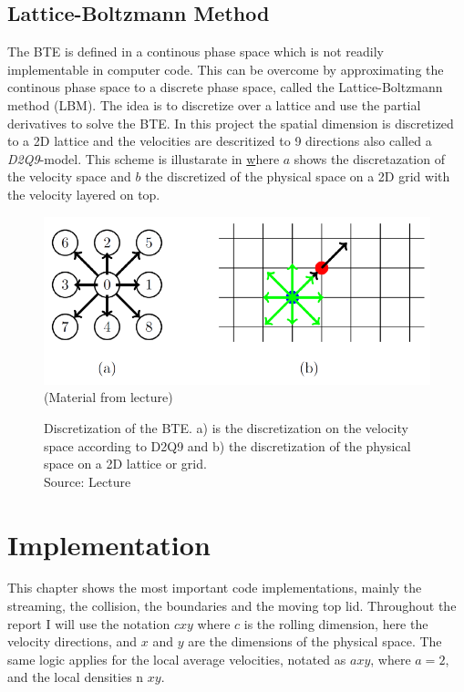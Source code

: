 \documentclass[a4paper,11pt, oneside]{book}
\begin{document}
\clearpage
\section{Lattice-Boltzmann Method} \label{sec:lbm}
The BTE is defined in a continous phase space which is not readily implementable in computer code.
This can be overcome by approximating the continous phase space to a discrete phase space, called the Lattice-Boltzmann method (LBM).
The idea is to discretize over a lattice and use the partial derivatives to solve the BTE.
In this project the spatial dimension is discretized to a 2D lattice and the velocities are descritized to 9 directions also called a \textit{D2Q9}-model.
This scheme is illustarate in \href{fig:d2q9-scheme} where $a$ shows the discretazation of the velocity space and $b$ the discretized of the physical space on a 2D grid with the velocity layered on top.
\begin{figure}[h]
  \centering
  \includegraphics[width=0.8\columnwidth]{d2q9_scheme.png}\\
  \small{(Material from lecture)}
  \caption[Discretization of the BTE]{Discretization of the BTE. a) is the discretization on the velocity space according to D2Q9 and b) the discretization of the physical space on a  2D lattice or grid.\\
  Source: Lecture}
  \label{fig:d2q9-scheme}
\end{figure}


\chapter{Implementation}
This chapter shows the most important code implementations, mainly the streaming, the collision, the boundaries and the moving top lid.
Throughout the report I will use the notation $cxy$ where $c$ is the rolling dimension, here the velocity directions, and $x$ and $y$ are the dimensions of the physical space. The same logic applies for the local average velocities, notated as $axy$, where $a=2$, and the local densities n $xy$.
\end{document}
